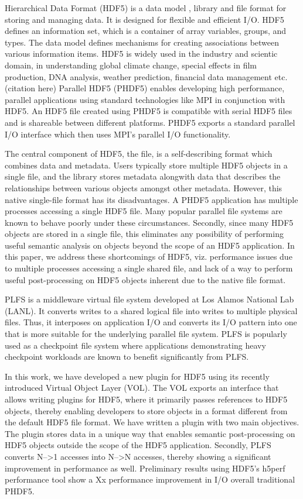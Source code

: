Hierarchical Data Format (HDF5) is a data model , library and file format for storing and managing data. It is designed for flexible and efficient I/O. HDF5 defines an information set, which is a container of array variables, groups, and types. The data model defines mechanisms for creating associations between various information items. HDF5 is widely used in the industry and scientic domain, in understanding global climate change, special effects in film production, DNA analysis, weather prediction, financial data management etc. (citation here)
Parallel HDF5 (PHDF5) enables developing high performance, parallel applications using standard technologies like MPI in conjunction with HDF5. An HDF5 file created using PHDF5 is compatible with serial HDF5 files and is shareable between different platforms. PHDF5 exports a standard parallel I/O interface which then uses MPI's parallel I/O functionality. 

The central component of HDF5, the file, is a self-describing format which combines data and metadata. Users typically store multiple HDF5 objects in a single file, and the library stores metadata alongwith data that describes the relationships between various objects amongst other metadata. 
However, this native single-file format has its disadvantages. A PHDF5 application has multiple processes accessing a single HDF5 file. Many popular parallel file systems are known to behave poorly under these circumstances. Secondly, since many HDF5 objects are stored in a single file, this eliminates any possibility of performing useful semantic analysis on objects beyond the scope of an HDF5 application. In this paper, we address these shortcomings of HDF5, viz. performance issues due to multiple processes accessing a single shared file, and lack of a way to perform useful post-processing on HDF5 objects inherent due to the native file format. 

PLFS is a middleware virtual file system developed at Los Alamos National Lab (LANL). It converts writes to a shared logical file into writes to multiple physical files.  
Thus, it interposes on application I/O and converts its I/O pattern into one that is more suitable for the underlying parallel file system.
PLFS is popularly used as a checkpoint file system where applications demonstrating heavy checkpoint workloads are known to benefit significantly from PLFS.

In this work, we have developed a new plugin for HDF5 using its recently introduced Virtual Object Layer (VOL). The VOL exports an interface that allows writing plugins for HDF5, where it primarily passes references to HDF5 objects, thereby enabling developers to store objects in a format different from the default HDF5 file format. 
We have written a plugin with two main objectives. The plugin stores data in a unique way that enables semantic post-processing on HDF5 objects outside the scope of the HDF5 application. Secondly, PLFS converts N-->1 accesses into N-->N accesses, thereby showing a significant improvement in performance as well. Preliminary results using HDF5's h5perf performance tool show a Xx performance improvement in I/O overall traditional PHDF5.

